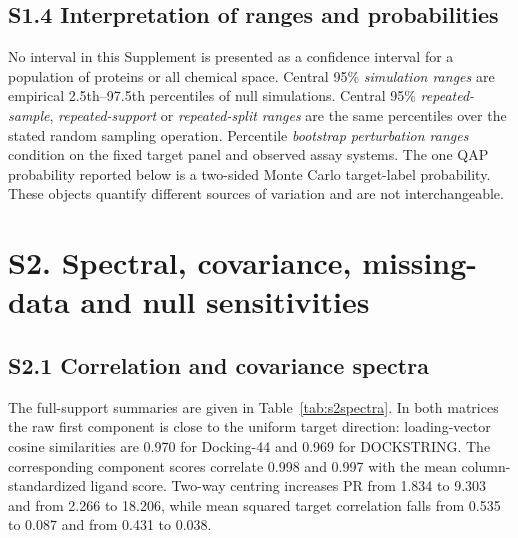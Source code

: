 \documentclass[11pt]{article}
\begin{document}
\subsection*{S1.4 Interpretation of ranges and probabilities}

No interval in this Supplement is presented as a confidence interval for a
population of proteins or all chemical space. Central 95\% \emph{simulation
ranges} are empirical 2.5th--97.5th percentiles of null simulations. Central
95\% \emph{repeated-sample}, \emph{repeated-support} or
\emph{repeated-split ranges} are the same percentiles over the stated random
sampling operation. Percentile \emph{bootstrap perturbation ranges} condition
on the fixed target panel and observed assay systems. The one QAP probability
reported below is a two-sided Monte Carlo target-label probability. These
objects quantify different sources of variation and are not interchangeable.

\section*{S2. Spectral, covariance, missing-data and null sensitivities}

\subsection*{S2.1 Correlation and covariance spectra}

The full-support summaries are given in Table~\ref{tab:s2spectra}. In both
matrices the raw first component is close to the uniform target direction:
loading-vector cosine similarities are 0.970 for Docking-44 and 0.969 for
DOCKSTRING. The corresponding component scores correlate 0.998 and 0.997 with
the mean column-standardized ligand score. Two-way centring increases PR from
1.834 to 9.303 and from 2.266 to 18.206, while mean squared target correlation
falls from 0.535 to 0.087 and from 0.431 to 0.038.

\begin{table}[htbp]
\centering
\caption{Full-support correlation-spectrum summaries. The numbers are fixed
matrix summaries, not estimates for a target superpopulation.}
\label{tab:s2spectra}
\small
{}
\end{table}
\end{document}
